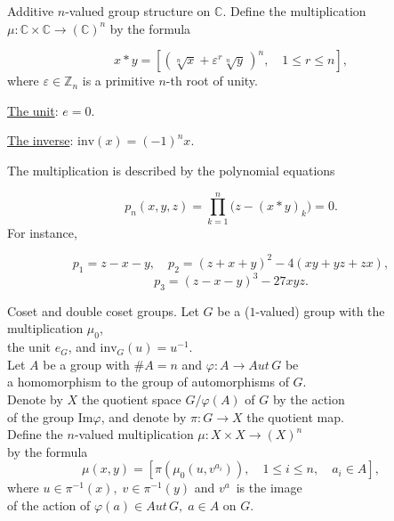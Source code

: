 \documentclass{beamer}
\begin{document}
\begin{frame}{Additive $n$-valued group structure on $\mathbb{C}$.}
Define the multiplication\; $\mu\colon \mathbb{C}\times \mathbb{C}\to \mathbb{(C)}^n$\;
by the formula
\vspace{-0.2cm}

\[
x*y=[(\sqrt[n]{x}+\varepsilon^r \sqrt[n]{y}\,)^n,\quad 1\leqslant r\leqslant n],
\]
where $\varepsilon \in \mathbb{Z}_n$ is a
primitive $n$-th root of unity.
\vspace{0.2cm}

\underline{The unit}: $e=0$.
\vspace{0.2cm}

\underline{The inverse}: $\mathrm{inv}(x)=(-1)^n x$.
\vspace{0.2cm}

The multiplication is described by the polynomial equations
\vspace{-0.2cm}

\[
p_n(x,y,z)=\prod_{k=1}^n\big(z-(x*y)_k\big) = 0.
\]
For instance,
\vspace{-0.3cm}

\[
p_1=z-x-y,\quad p_2=(z+x+y)^2-4(x y+y z+z x),
\]
\[
p_3=(z-x-y)^3-27xyz.
\]
\end{frame}




\begin{frame}{Coset and double coset groups.}
Let $G$ be a ($1$-valued) group with the multiplication $\mu_0$,\\
the unit $e_G$, and $\mathrm{inv}_G(u) = u^{-1}$.\\[5pt]
Let $A$ be a group  with $\# A=n$\; and\; $\varphi : A \to Aut\,G$ be\\
a homomorphism to the group of automorphisms of $G$. \\[5pt]
Denote by $X$ the quotient space $G/\varphi(A)$ of $G$ by the action\\ of the group
$\mathrm{Im}\varphi$, and denote by $\pi\colon G\to X$ the quotient map.\\[5pt]

Define the $n$-valued multiplication\; $\mu\colon X\times X\to (X)^n$\\ by the formula
\[
\mu(x,y)=[\pi(\mu_0(u,v^{a_i})),\quad 1\leqslant i\leqslant n,\quad a_i\in A],
\]
where\; $u\in \pi^{-1}(x),\;v\in \pi^{-1}(y)$\; and\; $v^a$\, is the image\\
of the action of $\varphi(a) \in Aut\,G, \; a \in A$\; on\; $G$.
\end{frame}
\end{document}
